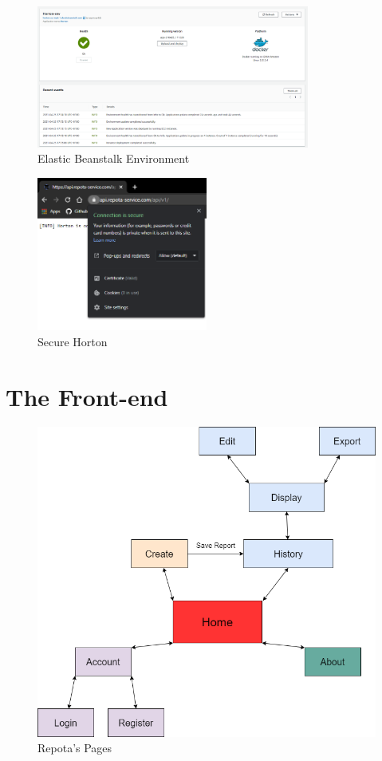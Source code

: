 \begin{figure}[H]
    \caption{Elastic Beanstalk Environment}
    \label{image:elasticHorton}
    \centering
    \includegraphics[width=0.8\textwidth]{images/aws/elastic_horton.png}
\end{figure}

\begin{figure}[H]
    \caption{Secure Horton}
    \label{image:secureHorton}
    \centering
    \includegraphics[width=0.5\textwidth]{images/aws/secure_horton.png}
\end{figure}

\section{The Front-end}
\begin{figure}[H]
    \caption{Repota's Pages}
    \label{image:repotaPages}
    \centering
    \includegraphics[width=1.0\textwidth]{images/repota/pages_diagram.png}
\end{figure}

